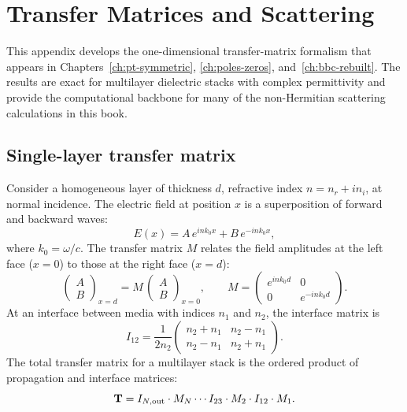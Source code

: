 \chapter{Transfer Matrices and Scattering}
\label{app:transfer}

This appendix develops the one-dimensional transfer-matrix formalism
that appears in Chapters~\ref{ch:pt-symmetric}, \ref{ch:poles-zeros},
and~\ref{ch:bbc-rebuilt}. The results are exact for multilayer
dielectric stacks with complex permittivity and provide the
computational backbone for many of the non-Hermitian scattering
calculations in this book.


\section{Single-layer transfer matrix}
\label{sec:single-layer}

Consider a homogeneous layer of thickness $d$, refractive index
$n = n_r + i n_i$, at normal incidence. The electric field at
position $x$ is a superposition of forward and backward waves:
\begin{equation}
 E(x) = A\,e^{ink_0 x} + B\,e^{-ink_0 x},
 \label{eq:field-ab}
\end{equation}
where $k_0 = \omega/c$. The transfer matrix $M$ relates the field
amplitudes at the left face ($x = 0$) to those at the right face
($x = d$):
\begin{equation}
 \begin{pmatrix} A \\ B \end{pmatrix}_{\!x=d}
 = M\,
 \begin{pmatrix} A \\ B \end{pmatrix}_{\!x=0},
 \qquad
 M = \begin{pmatrix}
 e^{ink_0 d} & 0 \\
 0 & e^{-ink_0 d}
 \end{pmatrix}.
 \label{eq:propagation-matrix}
\end{equation}
At an interface between media with indices $n_1$ and $n_2$, the
interface matrix is
\begin{equation}
 I_{12} = \frac{1}{2n_2}\begin{pmatrix}
 n_2 + n_1 & n_2 - n_1 \\
 n_2 - n_1 & n_2 + n_1
 \end{pmatrix}.
 \label{eq:interface-matrix}
\end{equation}
The total transfer matrix for a multilayer stack is the ordered product
of propagation and interface matrices:
\begin{equation}
 \mathbf{T} = I_{N,\mathrm{out}} \cdot M_N \cdots I_{23} \cdot M_2
 \cdot I_{12} \cdot M_1.
 \label{eq:total-transfer}
\end{equation}


